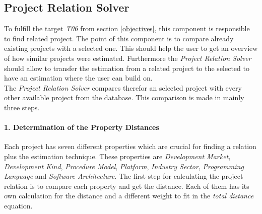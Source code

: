 \subsection{Project Relation Solver}\label{projectRealtionSolver}

To fulfill the target \textit{T06} from section \ref{objectives}, this component is responsible to find related project. The point of this component is to compare already existing projects with a selected one. This should help the user to get an overview of how similar projects were estimated. Furthermore the \textit{Project Relation Solver} should allow to transfer the estimation from a related project to the selected to have an estimation where the user can build on.\\
The \textit{Project Relation Solver} compares therefor an selected project with every other available project from the database. This comparison is made in mainly three steps.
\paragraph*{\textbf{1. Determination of the Property Distances}}
Each project has seven different properties which are crucial for finding a relation plus the estimation technique. These properties are \textit{Development Market}, \textit{Development Kind}, \textit{Procedure Model}, \textit{Platform}, \textit{Industry Sector}, \textit{Programming Language} and \textit{Software Architecture}. The first step for calculating the project relation is to compare each property and get the distance. Each of them has its own calculation for the distance and a different weight to fit in the \textit{total distance} equation. 
